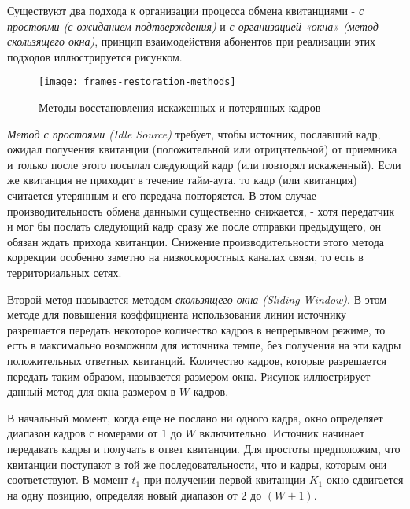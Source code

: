 Существуют два подхода к организации процесса обмена квитанциями - \emph{с простоями (с ожиданием подтверждения)} и \emph{с организацией «окна» (метод скользящего окна)}, принцип взаимодействия абонентов при реализации этих подходов иллюстрируется рисунком.

\begin{figure}
    \centering
    \texttt{[image: frames-restoration-methods]}
    \caption{Методы восстановления искаженных и потерянных кадров}
    \label{fig:frames-restoration-methods}
\end{figure}

\emph{Метод с простоями (Idle Source)} требует, чтобы источник, пославший кадр, ожидал получения квитанции (положительной или отрицательной) от приемника и только после этого посылал следующий кадр (или повторял искаженный).
Если же квитанция не приходит в течение тайм-аута, то кадр (или квитанция) считается утерянным и его передача повторяется.
В этом случае производительность обмена данными существенно снижается, - хотя передатчик и мог бы послать следующий кадр сразу же после отправки предыдущего, он обязан ждать прихода квитанции.
Снижение производительности этого метода коррекции особенно заметно на низкоскоростных каналах связи, то есть в территориальных сетях.

Второй метод называется методом \emph{скользящего окна (Sliding Window)}.
В этом методе для повышения коэффициента использования линии источнику разрешается передать некоторое количество кадров в непрерывном режиме, то есть в максимально возможном для источника темпе, без получения на эти кадры положительных ответных квитанций.
Количество кадров, которые разрешается передать таким образом, называется размером окна.
Рисунок иллюстрирует данный метод для окна размером в $W$ кадров.

В начальный момент, когда еще не послано ни одного кадра, окно определяет диапазон кадров с номерами от $1$ до $W$ включительно.
Источник начинает передавать кадры и получать в ответ квитанции.
Для простоты предположим, что квитанции поступают в той же последовательности, что и кадры, которым они соответствуют.
В момент $t_1$ при получении первой квитанции $K_1$ окно сдвигается на одну позицию, определяя новый диапазон от $2$ до $(W + 1)$.

